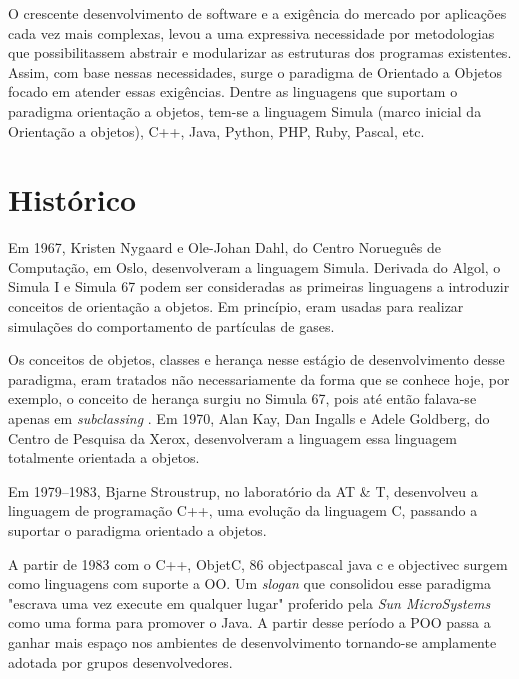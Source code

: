 \documentclass[11pt,a4paper]{article}
\begin{document}
O crescente desenvolvimento de software e a exigência do mercado por aplicações cada vez mais complexas, levou a uma expressiva necessidade por metodologias que possibilitassem abstrair e modularizar as estruturas dos programas existentes. Assim, com base nessas necessidades, surge o paradigma de Orientado a Objetos focado em atender essas exigências. Dentre as linguagens que suportam o paradigma orientação a objetos, tem-se a linguagem Simula (marco inicial da Orientação a objetos), C++, Java, Python, PHP, Ruby, Pascal, etc.


\section{Histórico}

Em 1967, Kristen Nygaard e Ole-Johan Dahl, do Centro Norueguês de Computação, em Oslo, desenvolveram a linguagem Simula. Derivada do Algol, o Simula I e Simula 67 podem ser consideradas as primeiras linguagens a introduzir conceitos de orientação a objetos. Em princípio, eram usadas para realizar simulações do comportamento de partículas de gases.

Os conceitos de objetos, classes e herança nesse estágio de desenvolvimento desse paradigma, eram tratados não necessariamente da forma que se conhece hoje, por exemplo, o conceito de herança surgiu no Simula 67, pois até então falava-se apenas em \textit{subclassing} \cite{black2013object}. Em 1970, Alan Kay, Dan Ingalls e Adele Goldberg, do Centro de Pesquisa da Xerox, desenvolveram a linguagem essa linguagem totalmente orientada a objetos.

Em 1979–1983, Bjarne Stroustrup, no laboratório da AT \& T, desenvolveu a linguagem de programação C++, uma evolução da linguagem C, passando a suportar o paradigma orientado a objetos.

A partir de 1983 com o C++, ObjetC, 86 objectpascal java c e objectivec surgem como linguagens com suporte a OO. Um \textit{slogan} que consolidou esse paradigma "escrava uma vez execute em qualquer lugar" proferido pela \textit{Sun MicroSystems} como uma forma para promover o Java. A partir desse período a POO passa a ganhar mais espaço nos ambientes de desenvolvimento tornando-se amplamente adotada por grupos desenvolvedores. 

\end{document}
